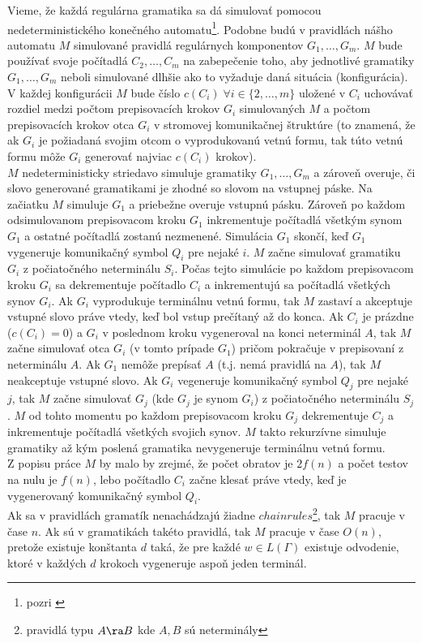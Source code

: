 \begin{dokaz}
Vieme, že každá regulárna gramatika sa dá simulovať pomocou
nedeterministického konečného automatu\footnote{pozri
\cite{Hopc}}. Podobne budú v pravidlách nášho automatu $M$
simulované pravidlá regulárnych komponentov $G_1,\dots ,G_m$. $M$
bude používať svoje počítadlá $C_2,\dots ,C_m$ na zabepečenie
toho, aby jednotlivé gramatiky $G_1,\dots ,G_m$ neboli simulované
dlhšie ako to vyžaduje daná situácia (konfigurácia). V každej
konfigurácii $M$ bude číslo $c(C_i)\; \forall i\in\{2,\dots ,m\}$
uložené v $C_i$ uchovávať rozdiel medzi počtom prepisovacích
krokov $G_i$ simulovaných $M$ a počtom prepisovacích krokov otca
$G_i$ v stromovej komunikačnej štruktúre (to znamená, že ak $G_i$
je požiadaná svojim otcom o vyprodukovanú vetnú formu, tak túto
vetnú formu môže $G_i$ generovať najviac $c(C_i)$ krokov).
\\ $M$ nedeterministicky striedavo simuluje gramatiky $G_1,\dots ,G_m$ a
zároveň overuje, či slovo ge\-ne\-ro\-va\-né gramatikami je zhodné
so slovom na vstupnej páske. Na začiatku $M$ simuluje $G_1$ a
priebežne overuje vstupnú pásku. Zároveň po každom odsimulovanom
prepisovacom kroku $G_1$ inkrementuje počítadlá všetkým synom
$G_1$ a ostatné počítadlá zostanú nezmenené. Simulácia $G_1$
skončí, keď $G_1$ vygeneruje komunikačný symbol $Q_i$ pre nejaké
$i$. $M$ začne simulovať gramatiku $G_i$ z počiatočného
neterminálu $S_i$. Počas tejto simulácie po každom prepisovacom
kroku $G_i$ sa dekrementuje počítadlo $C_i$ a inkrementujú sa
počítadlá všetkých sy\-nov $G_i$. Ak $G_i$ vyprodukuje terminálnu
vetnú formu, tak $M$ zastaví a akceptuje vstupné slovo práve
vtedy, keď bol vstup prečítaný až do konca. Ak $C_i$ je prázdne
($c(C_i)=0$) a $G_i$ v poslednom kroku vygeneroval na konci
neterminál $A$, tak $M$ začne simulovať otca $G_i$ (v tomto
prípade $G_1$) pričom pokračuje v prepisovaní z neterminálu $A$.
Ak $G_1$ nemôže prepísať $A$ (t.j. nemá pravidlá na $A$), tak $M$
neakceptuje vstupné slovo. Ak $G_i$ vegeneruje komunikačný symbol
$Q_j$ pre nejaké $j$, tak $M$ začne simulovať $G_j$ (kde $G_j$ je
synom $G_i$) z počiatočného neterminálu $S_j$. $M$ od tohto
momentu po každom prepisovacom kroku $G_j$ dekrementuje $C_j$ a
inkrementuje počítadlá všetkých svojich synov. $M$ takto
rekurzívne simuluje gramatiky až kým poslená gramatika
nevygeneruje terminálnu vetnú formu. \\ Z popisu práce $M$ by malo
by zrejmé, že počet obratov je $2f(n)$ a počet testov na nulu je
$f(n)$, lebo počítadlo $C_i$ začne klesať práve vtedy, keď je
vygenerovaný komunikačný symbol $Q_i$. \\ Ak sa v pravidlách
gramatík nenachádzajú žiadne $chain rules$\footnote{pravidlá typu
$A\ra B$ kde $A,B$ sú neterminály}, tak $M$ pracuje v čase $n$. Ak
sú v gramatikách takéto pravidlá, tak $M$ pracuje v čase $O(n)$,
pretože existuje konštanta $d$ taká, že pre každé $w\in L(\Gamma)$
existuje odvodenie, ktoré v každých $d$ krokoch vygeneruje aspoň
jeden terminál.
\end{dokaz}

